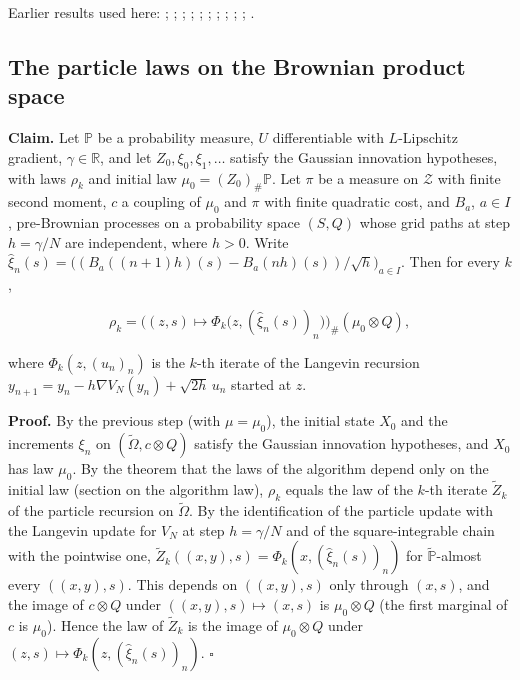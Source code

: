 \documentclass[11pt,a4paper]{report}
\begin{document}
Earlier results used here: \cite[Section~3.17.1]{LangevinLean2026ULASC}; \cite[Section~3.17.2]{LangevinLean2026ULASC}; \cite[Section~3.22.19]{LangevinLean2026ULASC}; \cite[Section~3.22.2]{LangevinLean2026ULASC}; \cite[Section~3.22.3]{LangevinLean2026ULASC}; \cite[Section~3.23.5]{LangevinLean2026ULASC}; \cite[Section~3.32.14]{LangevinLean2026ULASC}; \cite[Section~3.32.15]{LangevinLean2026ULASC}; \cite[Section~3.32.16]{LangevinLean2026ULASC}; \cite[Section~3.32.4]{LangevinLean2026ULASC}; \cite[Section~3.32.5]{LangevinLean2026ULASC}.
\subsection{\texorpdfstring{The particle laws on the Brownian product space}{The particle laws on the Brownian product space}}
\label{report-step-IPLA-ULAAdapter-lean-2}


\textbf{Claim.} Let \(\mathbb P\) be a probability measure, \(U\) differentiable with \(L\)-Lipschitz gradient, \(\gamma\in\mathbb R\), and let \(Z_0,\xi_0,\xi_1,\dots\) satisfy the Gaussian innovation hypotheses, with laws \(\rho_k\) and initial law \(\mu_0=(Z_0)_\#\mathbb P\). Let \(\pi\) be a measure on \(\mathcal Z\) with finite second moment, \(c\) a coupling of \(\mu_0\) and \(\pi\) with finite quadratic cost, and \(B_a\), \(a\in I\), pre-Brownian processes on a probability space \((S,Q)\) whose grid paths at step \(h=\gamma/N\) are independent, where \(h>0\). Write \(\hat\xi_n(s)=\bigl((B_a((n+1)h)(s)-B_a(nh)(s))/\sqrt h\bigr)_{a\in I}\). Then for every \(k\),


\[\rho_k=\bigl((z,s)\mapsto\Phi_k\bigl(z,(\hat\xi_n(s))_{n}\bigr)\bigr)_\#(\mu_0\otimes Q),\]


where \(\Phi_k(z,(u_n)_n)\) is the \(k\)-th iterate of the Langevin recursion \(y_{n+1}=y_n-h\nabla V_N(y_n)+\sqrt{2h}\,u_n\) started at \(z\).




\textbf{Proof.} By the previous step (with \(\mu=\mu_0\)), the initial state \(X_0\) and the increments \(\xi_n\) on \((\tilde\Omega,c\otimes Q)\) satisfy the Gaussian innovation hypotheses, and \(X_0\) has law \(\mu_0\). By the theorem that the laws of the algorithm depend only on the initial law (section on the algorithm law), \(\rho_k\) equals the law of the \(k\)-th iterate \(\tilde Z_k\) of the particle recursion on \(\tilde\Omega\). By the identification of the particle update with the Langevin update for \(V_N\) at step \(h=\gamma/N\) and of the square-integrable chain with the pointwise one, \(\tilde Z_k((x,y),s)=\Phi_k(x,(\hat\xi_n(s))_n)\) for \(\tilde{\mathbb P}\)-almost every \(((x,y),s)\). This depends on \(((x,y),s)\) only through \((x,s)\), and the image of \(c\otimes Q\) under \(((x,y),s)\mapsto(x,s)\) is \(\mu_0\otimes Q\) (the first marginal of \(c\) is \(\mu_0\)). Hence the law of \(\tilde Z_k\) is the image of \(\mu_0\otimes Q\) under \((z,s)\mapsto\Phi_k(z,(\hat\xi_n(s))_n)\). \(\square\)
\end{document}
